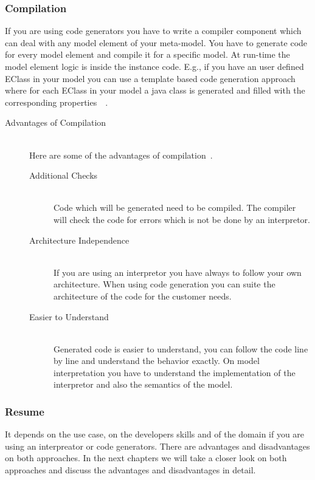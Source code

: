 \documentclass{llncs}
\begin{document}
\subsubsection{Compilation}
If you are using code generators you have to write a compiler component which can deal with any model element of your meta-model. You have to generate code for every model element and compile it for a specific model. At run-time the model element logic is inside the instance code. E.g., if you have an user defined EClass in your model you can use a template based code generation approach where for each EClass in your model a java class is generated and filled with the corresponding properties~\cite{misc:mdd}~\cite{jour:5}.

\begin{description}
\item [Advantages of Compilation] \hfill \\
Here are some of the advantages of compilation~\cite{misc:mdd}.
\begin{description}
\item [Additional Checks] \hfill \\
Code which will be generated need to be compiled. The compiler will check the code for errors which is not be done by an interpretor.
\item [Architecture Independence] \hfill \\
If you are using an interpretor you have always to follow your own architecture. When using code generation you can suite the architecture of the code for the customer needs.
\item [Easier to Understand] \hfill \\
Generated code is easier to understand, you can follow the code line by line and understand the behavior exactly. On model interpretation you have to understand the implementation of the interpretor and also the semantics of the model.
\end{description}
\end{description}

\subsubsection{Resume}
It depends on the use case, on the developers skills and of the domain if you are using an interpreator or code generators. There are advantages and disadvantages on both approaches. In the next chapters we will take a closer look on both approaches and discuss the advantages and disadvantages in detail.
\end{document}
